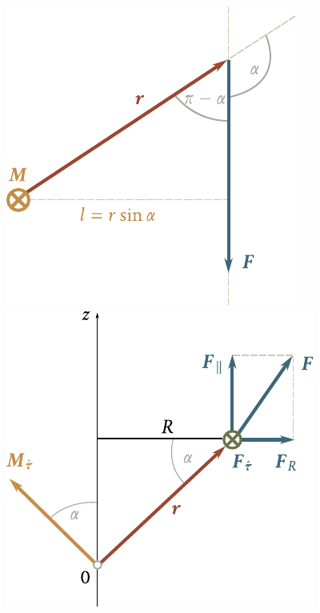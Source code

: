 \begin{figure}[t]
	\begin{minipage}[t]{0.5\linewidth}
		\begin{center}
			\includegraphics[scale=0.9]{figures/ch_03/fig_3_20.pdf}
			\caption[]{}
			\label{fig:3_20}
		\end{center}
	\end{minipage}
	\hspace{-0.05cm}
	\begin{minipage}[t]{0.5\linewidth}
		\begin{center}
			\includegraphics[scale=0.9]{figures/ch_03/fig_3_21.pdf}
			\caption[]{}
			\label{fig:3_21}
		\end{center}
	\end{minipage}
	\vspace{-0.3cm}
\end{figure}

